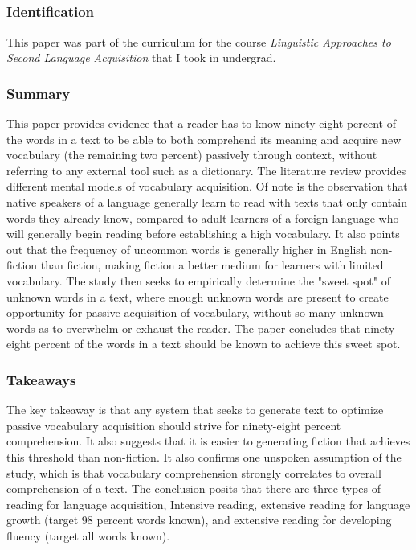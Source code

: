 \documentclass[
	letterpaper, %
]{jdf}
\begin{document}
\subsection{}
\subsubsection{Identification}
This paper was part of the curriculum for the course \textit{Linguistic Approaches to Second Language Acquisition} that I took in undergrad.

\subsubsection{Summary}
This paper provides evidence that a reader has to know ninety-eight percent of the words in a text to be able to both comprehend its meaning and acquire new vocabulary (the remaining two percent) passively through context, without referring to any external tool such as a dictionary. The literature review provides different mental models of vocabulary acquisition. Of note is the observation that native speakers of a language generally learn to read with texts that only contain words they already know, compared to adult learners of a foreign language who will generally begin reading before establishing a high vocabulary. It also points out that the frequency of uncommon words is generally higher in English non-fiction than fiction, making fiction a better medium for learners with limited vocabulary. The study then seeks to empirically determine the "sweet spot" of unknown words in a text, where enough unknown words are present to create opportunity for passive acquisition of vocabulary, without so many unknown words as to overwhelm or exhaust the reader. The paper concludes that ninety-eight percent of the words in a text should be known to achieve this sweet spot.

\subsubsection{Takeaways}
The key takeaway is that any system that seeks to generate text to optimize passive vocabulary acquisition should strive for ninety-eight percent comprehension. It also suggests that it is easier to generating fiction that achieves this threshold than non-fiction. It also confirms one unspoken assumption of the study, which is that vocabulary comprehension strongly correlates to overall comprehension of a text. The conclusion posits that there are three types of reading for language acquisition, Intensive reading, extensive reading for language growth (target 98 percent words known), and extensive reading for developing fluency (target all words known).
\end{document}
